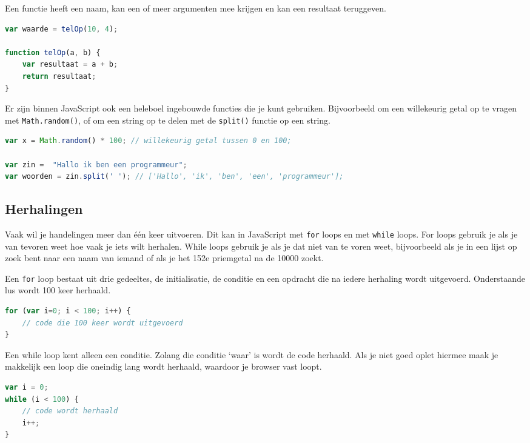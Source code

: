 \documentclass[8pt,pagesize,footinclude=false,headinclude=false]{scrartcl}
\begin{document}
\begin{multicols*}{3}
Een functie heeft een naam, kan een of meer argumenten mee krijgen en kan een resultaat teruggeven.
\begin{lstlisting}[language=javascript]
var waarde = telOp(10, 4); 
	
function telOp(a, b) {
	var resultaat = a + b;
	return resultaat;
}
\end{lstlisting}
\noindent Er zijn binnen JavaScript ook een heleboel ingebouwde functies die je kunt gebruiken. Bijvoorbeeld om een willekeurig getal op te vragen met \texttt{Math.random()}, of om een string op te delen met de \texttt{split()} functie op een string.

\begin{lstlisting}[language=javascript]
var x = Math.random() * 100; // willekeurig getal tussen 0 en 100;

var zin =  "Hallo ik ben een programmeur";
var woorden = zin.split(' '); // ['Hallo', 'ik', 'ben', 'een', 'programmeur'];
\end{lstlisting}

\subsection*{Herhalingen}
Vaak wil je handelingen meer dan \'e\'en keer uitvoeren. Dit kan in JavaScript met \texttt{for} loops en met \texttt{while} loops. For loops gebruik je als je van tevoren weet hoe vaak je iets wilt herhalen. While loops gebruik je als je dat niet van te voren weet, bijvoorbeeld als je in een lijst op zoek bent naar een naam van iemand of als je het 152e priemgetal na de 10000 zoekt.

Een \texttt{for} loop bestaat uit drie gedeeltes, de initialisatie, de conditie en een opdracht die na iedere herhaling wordt uitgevoerd. Onderstaande lus wordt 100 keer herhaald.

\begin{lstlisting}[language=javascript]
for (var i=0; i < 100; i++) {
	// code die 100 keer wordt uitgevoerd
}
\end{lstlisting}

\noindent Een while loop kent alleen een conditie. Zolang die conditie `waar' is wordt de code herhaald. Als je niet goed oplet hiermee maak je makkelijk een loop die oneindig lang wordt herhaald, waardoor je browser vast loopt.

\begin{lstlisting}[language=javascript]
var i = 0;
while (i < 100) {
	// code wordt herhaald
	i++;
}
\end{lstlisting}


\end{multicols*}
\end{document}
